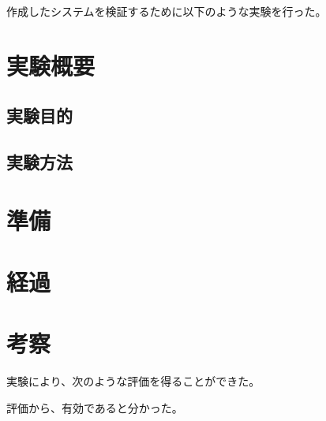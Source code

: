 作成したシステムを検証するために以下のような実験を行った。
\section{実験概要}
\subsection{実験目的}
\subsection{実験方法}
\section{準備}
\section{経過}
\section{考察}


実験により、次のような評価を得ることができた。

評価から、有効であると分かった。

